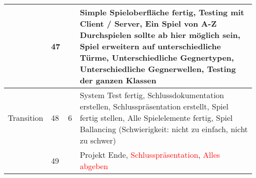 \begin{tabular}{ | l | l | l | p{9.5cm} |}
 & 47 &    &  Simple Spieloberfläche fertig, Testing mit Client / Server, Ein Spiel von A-Z Durchspielen sollte ab hier möglich sein, Spiel erweitern auf unterschiedliche Türme, Unterschiedliche Gegnertypen, Unterschiedliche Gegnerwellen, Testing der ganzen Klassen \\ \hline
Transition & 48 &  6  & System Test fertig, Schlussdokumentation erstellen, Schlusspräsentation erstellt, Spiel fertig stellen, Alle Spielelemente fertig, Spiel Ballancing (Schwierigkeit: nicht zu einfach, nicht zu schwer) \\ \hline
 & 49 &   & Projekt Ende, \textcolor{red}{Schlusspräsentation}, \textcolor{red}{Alles abgeben} \\
 \hline
 \end{tabular}


